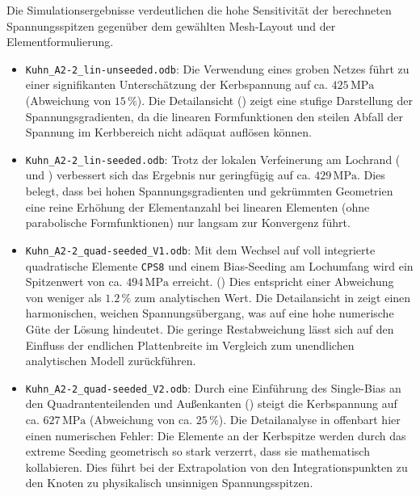 Die Simulationsergebnisse verdeutlichen die hohe Sensitivität der berechneten Spannungsspitzen gegenüber dem gewählten Mesh-Layout und der Elementformulierung.
\begin{itemize}
    \item \texttt{Kuhn\_A2-2\allowbreak \_lin-unseeded.odb}: Die Verwendung eines groben Netzes  führt zu einer signifikanten Unterschätzung der Kerbspannung auf ca. ${425\,\mathrm{MPa}}$ (Abweichung von ${15\,\%}$). Die Detailansicht () zeigt eine stufige Darstellung der Spannungsgradienten, da die linearen Formfunktionen den steilen Abfall der Spannung im Kerbbereich nicht adäquat auflösen können.
    \item \texttt{Kuhn\_A2-2\_lin-seeded.odb}: Trotz der lokalen Verfeinerung am Lochrand ( und ) verbessert sich das Ergebnis nur geringfügig auf ca. ${429\,\mathrm{MPa}}$. Dies belegt, dass bei hohen Spannungsgradienten und gekrümmten Geometrien eine reine Erhöhung der Elementanzahl bei linearen Elementen (ohne parabolische Formfunktionen) nur langsam zur Konvergenz führt.
    \item \texttt{Kuhn\_A2-2\_quad-seeded\_V1.odb}: Mit dem Wechsel auf voll integrierte quadratische Elemente \texttt{CPS8} und einem Bias-Seeding am Lochumfang wird ein Spitzenwert von ca. ${494\,\mathrm{MPa}}$ erreicht. () Dies entspricht einer Abweichung von weniger als ${1.2\,\%}$ zum analytischen Wert. Die Detailansicht in  zeigt einen harmonischen, weichen Spannungsübergang, was auf eine hohe numerische Güte der Lösung hindeutet. Die geringe Restabweichung lässt sich auf den Einfluss der endlichen Plattenbreite im Vergleich zum unendlichen analytischen Modell zurückführen.
    \item \texttt{Kuhn\_A2-2\_quad-seeded\_V2.odb}: Durch eine Einführung des Single-Bias an den Quadrantenteilenden und Außenkanten () steigt die Kerbspannung auf ca. ${627\,\mathrm{MPa}}$ (Abweichung von ca. ${25\,\%}$). Die Detailanalyse in  offenbart hier einen numerischen Fehler: Die Elemente an der Kerbspitze werden durch das extreme Seeding geometrisch so stark verzerrt, dass sie mathematisch kollabieren. Dies führt bei der Extrapolation von den Integrationspunkten zu den Knoten zu physikalisch unsinnigen Spannungsspitzen.
\end{itemize}

